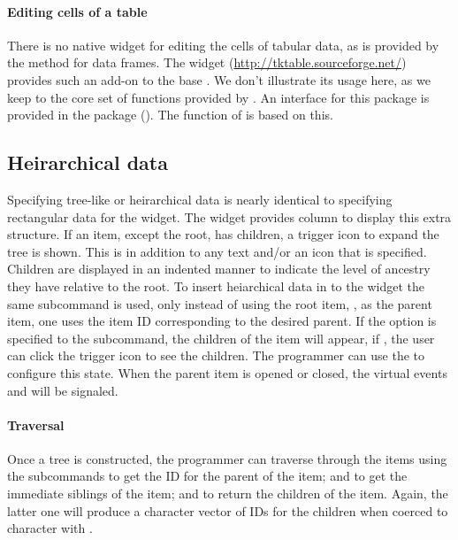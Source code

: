 \paragraph{Editing cells of a table}
There is no native widget for editing the cells of tabular data, as is
provided by the  method for data frames. The
 widget (\url{http://tktable.sourceforge.net/}) provides
such an add-on to the base \TK. We don't illustrate its usage here, as
we keep to the core set of functions provided by \TK.  An interface
for this \TCL\/ package is provided in the  package
().  The  function of 
is based on this.



\subsection{Heirarchical data}

Specifying tree-like or heirarchical data is nearly identical to
specifying rectangular data for the  widget.  The
widget provides column  to display this extra structure. If
an item, except the root, has children, a trigger icon to expand the
tree is shown. This is in addition to any text and/or an icon that is
specified. Children are displayed in an indented manner to indicate
the level of ancestry they have relative to the root.  To insert
heiarchical data in to the widget the same
 subcommand is used, only instead of
using the root item, \qcode{}, as the parent item, one uses the item
ID corresponding to the desired parent. If the option 
is specified to the  subcommand, the children of the item
will appear, if , the user can click the trigger icon to
see the children. The programmer can use the
 to configure this state. When the
parent item is opened or closed, the virtual events
 and  will be
signaled.



\paragraph{Traversal}
Once a tree is constructed, the programmer can traverse
through the items using the subcommands
 to get the ID for the parent of the
item;  and
 to get the immediate siblings of the
item; and  to return the children of
the item. Again, the latter one will produce a character vector of  IDs for the
children when coerced to character with .



